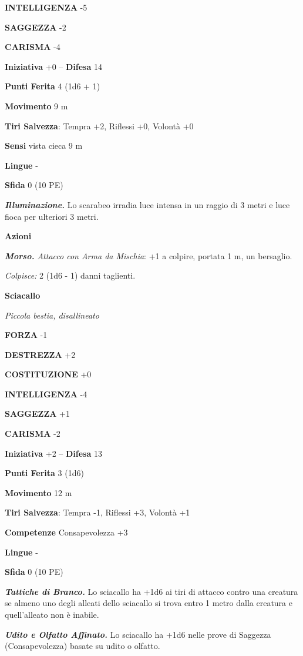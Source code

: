 \begin{multicols}{2}
\textbf{INTELLIGENZA} -5

\textbf{SAGGEZZA} -2

\textbf{CARISMA} -4

\textbf{Iniziativa} +0 -- \textbf{Difesa} 14

\textbf{Punti Ferita} 4 (1d6 + 1)

\textbf{Movimento} 9 m

\textbf{Tiri Salvezza}: Tempra +2, Riflessi +0, Volontà +0

\textbf{Sensi} vista cieca 9 m

\textbf{Lingue} -

\textbf{Sfida} 0 (10 PE)

\emph{\textbf{Illuminazione.}} Lo scarabeo irradia luce intensa in un raggio di 3 metri e luce fioca per ulteriori 3 metri.

\textbf{Azioni}

\emph{\textbf{Morso.} Attacco con Arma da Mischia}: +1 a colpire, portata 1 m, un bersaglio.

\emph{Colpisce:} 2 (1d6 - 1) danni taglienti.

\medskip\textbf{Sciacallo}

\emph{Piccola bestia, disallineato}

\textbf{FORZA} -1

\textbf{DESTREZZA} +2

\textbf{COSTITUZIONE} +0

\textbf{INTELLIGENZA} -4

\textbf{SAGGEZZA} +1

\textbf{CARISMA} -2

\textbf{Iniziativa} +2 -- \textbf{Difesa} 13

\textbf{Punti Ferita} 3 (1d6)

\textbf{Movimento} 12 m

\textbf{Tiri Salvezza}: Tempra -1, Riflessi +3, Volontà +1

\textbf{Competenze} Consapevolezza +3

\textbf{Lingue} -

\textbf{Sfida} 0 (10 PE)

\emph{\textbf{Tattiche di Branco.}} Lo sciacallo ha +1d6 ai tiri di attacco contro una creatura se almeno uno degli alleati dello sciacallo si trova entro 1 metro dalla creatura e quell'alleato non è inabile.

\emph{\textbf{Udito e Olfatto Affinato.}} Lo sciacallo ha +1d6 nelle prove di Saggezza (Consapevolezza) basate su udito o olfatto.


\end{multicols}

